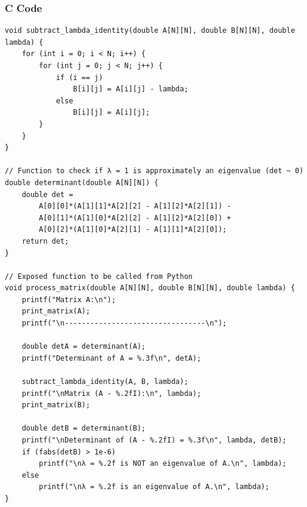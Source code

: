 \documentclass{beamer}
\begin{document}
\begin{frame}[fragile]
    \frametitle{C Code}
    \begin{lstlisting}
void subtract_lambda_identity(double A[N][N], double B[N][N], double lambda) {
    for (int i = 0; i < N; i++) {
        for (int j = 0; j < N; j++) {
            if (i == j)
                B[i][j] = A[i][j] - lambda;
            else
                B[i][j] = A[i][j];
        }
    }
}

// Function to check if λ = 1 is approximately an eigenvalue (det ~ 0)
double determinant(double A[N][N]) {
    double det =
        A[0][0]*(A[1][1]*A[2][2] - A[1][2]*A[2][1]) -
        A[0][1]*(A[1][0]*A[2][2] - A[1][2]*A[2][0]) +
        A[0][2]*(A[1][0]*A[2][1] - A[1][1]*A[2][0]);
    return det;
}

// Exposed function to be called from Python
void process_matrix(double A[N][N], double B[N][N], double lambda) {
    printf("Matrix A:\n");
    print_matrix(A);
    printf("\n---------------------------------\n");

    double detA = determinant(A);
    printf("Determinant of A = %.3f\n", detA);

    subtract_lambda_identity(A, B, lambda);
    printf("\nMatrix (A - %.2fI):\n", lambda);
    print_matrix(B);

    double detB = determinant(B);
    printf("\nDeterminant of (A - %.2fI) = %.3f\n", lambda, detB);
    if (fabs(detB) > 1e-6)
        printf("\nλ = %.2f is NOT an eigenvalue of A.\n", lambda);
    else
        printf("\nλ = %.2f is an eigenvalue of A.\n", lambda);
}



    \end{lstlisting}
\end{frame}
\end{document}
